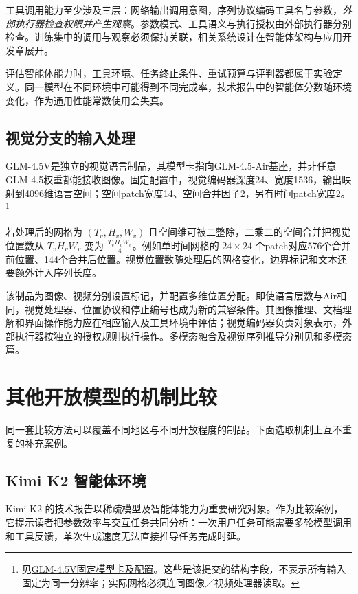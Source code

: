 \documentclass[../textbook.tex]{subfiles}
\begin{document}
工具调用能力至少涉及三层：网络输出调用意图，序列协议编码工具名与参数，\emph{外部执行器检查权限并产生观察}。参数模式、工具语义与执行授权由外部执行器分别检查。训练集中的调用与观察必须保持关联，相关系统设计在智能体架构与应用开发章展开。

评估智能体能力时，工具环境、任务终止条件、重试预算与评判器都属于实验定义。同一模型在不同环境中可能得到不同完成率，技术报告中的智能体分数随环境变化，作为通用性能常数使用会失真。

\subsection{视觉分支的输入处理}
GLM-4.5V是独立的视觉语言制品，其模型卡指向GLM-4.5-Air基座，并非任意GLM-4.5权重都能接收图像。固定配置中，视觉编码器深度24、宽度1536，输出映射到4096维语言空间；空间patch宽度14、空间合并因子2，另有时间patch宽度2。\footnote{见\href{https://huggingface.co/zai-org/GLM-4.5V/tree/ed47433b37111465ec527affaaddceff371bca04}{GLM-4.5V固定模型卡及配置}。这些是该提交的结构字段，不表示所有输入固定为同一分辨率；实际网格必须连同图像／视频处理器读取。}

\begin{example}[视觉网格的空间合并]
若处理后的网格为 $(T_v,H_v,W_v)$ 且空间维可被二整除，二乘二的空间合并把视觉位置数从 $T_vH_vW_v$ 变为 $\frac{T_vH_vW_v}{4}$。例如单时间网格的 $24\times24$ 个patch对应576个合并前位置、144个合并后位置。视觉位置数随处理后的网格变化，边界标记和文本还要额外计入序列长度。

该制品为图像、视频分别设置标记，并配置多维位置分配。即使语言层数与Air相同，视觉处理器、位置协议和停止编号也成为新的兼容条件。其图像推理、文档理解和界面操作能力应在相应输入及工具环境中评估；视觉编码器负责对象表示，外部执行器按独立的授权规则执行操作。多模态融合及视觉序列推导分别见和多模态篇。
\end{example}

\section{其他开放模型的机制比较}
\optional
同一套比较方法可以覆盖不同地区与不同开放程度的制品。下面选取机制上互不重复的补充案例。

\subsection{Kimi K2 智能体环境}
Kimi K2 的技术报告以稀疏模型及智能体能力为重要研究对象\cite{kimi2025k2}。作为比较案例，它提示读者把参数效率与交互任务共同分析：一次用户任务可能需要多轮模型调用和工具反馈，单次生成速度无法直接推导任务完成时延。
\end{document}
